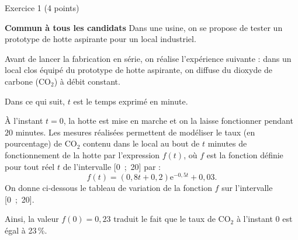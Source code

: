 
%
\begin{h2}Exercice 1 (4 points)\end{h2}
\textbf{Commun à  tous les candidats}
\medskip
Dans une usine, on se propose de tester un prototype de hotte aspirante pour un local industriel.
\par
Avant de lancer la fabrication en série, on réalise l'expérience suivante : dans un local clos équipé
du prototype de hotte aspirante, on diffuse du dioxyde de carbone (CO$_2$) à débit constant.
\par
Dans ce qui suit, $t$ est le temps exprimé en minute.
\par
À l'instant $t = 0$, la hotte est mise en marche et on la laisse fonctionner pendant $20$ minutes. Les
mesures réalisées permettent de modéliser le taux (en pourcentage) de CO$_2$ contenu dans le local au
bout de $t$ minutes de fonctionnement de la hotte par l'expression $f(t)$, où $f$ est la fonction définie
pour tout réel $t$ de l'intervalle [0~;~20] par :
\[f(t) = (0,8t + 0,2)\text{e}^{-0,5t} + 0,03.\]
On donne ci-dessous le tableau de variation de la fonction $f$ sur l'intervalle [0~;~20].
\par
Ainsi, la valeur $f(0) = 0,23$ traduit le fait que le taux
de CO$_2$ à l'instant $0$ est égal à 23\,\%.
